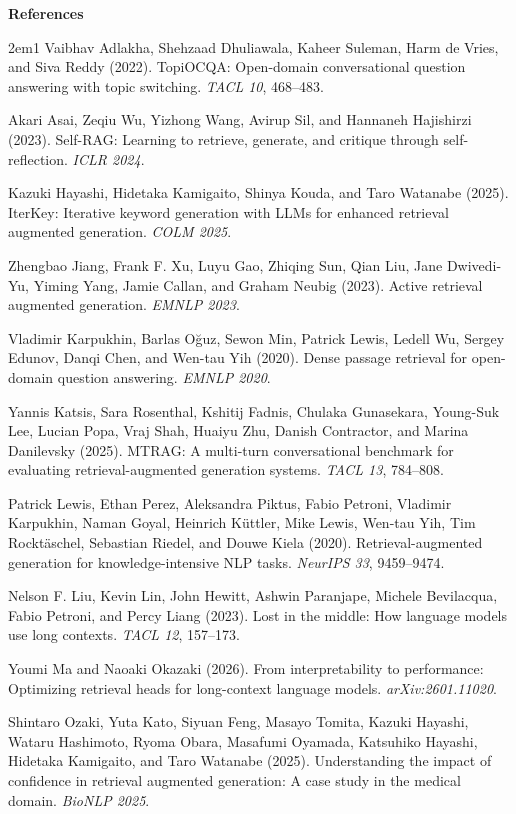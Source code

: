 \documentclass[11pt,a4paper]{article}
\begin{document}
\bigskip

\noindent\textbf{References}

\begin{hangparas}{2em}{1}
Vaibhav Adlakha, Shehzaad Dhuliawala, Kaheer Suleman, Harm de Vries, and Siva Reddy (2022). TopiOCQA:
    Open-domain conversational question answering with topic switching. \textit{TACL 10}, 468--483.

Akari Asai, Zeqiu Wu, Yizhong Wang, Avirup Sil, and Hannaneh Hajishirzi (2023). Self-RAG: Learning to retrieve, generate,
     and critique through self-reflection. \textit{ICLR 2024}.

Kazuki Hayashi, Hidetaka Kamigaito, Shinya Kouda, and Taro Watanabe (2025). IterKey: Iterative keyword generation with
    LLMs for enhanced retrieval augmented generation. \textit{COLM 2025}.

Zhengbao Jiang, Frank F. Xu, Luyu Gao, Zhiqing Sun, Qian Liu, Jane Dwivedi-Yu, Yiming Yang, Jamie Callan, and Graham
    Neubig (2023). Active retrieval augmented generation. \textit{EMNLP 2023}.

Vladimir Karpukhin, Barlas O\u{g}uz, Sewon Min, Patrick Lewis, Ledell Wu, Sergey Edunov, Danqi Chen, and Wen-tau Yih (2020).
    Dense passage retrieval for open-domain question answering. \textit{EMNLP 2020}.

Yannis Katsis, Sara Rosenthal, Kshitij Fadnis, Chulaka Gunasekara, Young-Suk Lee, Lucian Popa, Vraj Shah, Huaiyu Zhu,
    Danish Contractor, and Marina Danilevsky (2025). MTRAG: A multi-turn conversational benchmark for evaluating
    retrieval-augmented generation systems. \textit{TACL 13}, 784--808.

Patrick Lewis, Ethan Perez, Aleksandra Piktus, Fabio Petroni, Vladimir Karpukhin, Naman Goyal, Heinrich K\"uttler, Mike
    Lewis, Wen-tau Yih, Tim Rockt\"aschel, Sebastian Riedel, and Douwe Kiela (2020). Retrieval-augmented generation for
    knowledge-intensive NLP tasks. \textit{NeurIPS 33}, 9459--9474.

Nelson F. Liu, Kevin Lin, John Hewitt, Ashwin Paranjape, Michele Bevilacqua, Fabio Petroni, and Percy Liang (2023).
    Lost in the middle: How language models use long contexts. \textit{TACL 12}, 157--173.

Youmi Ma and Naoaki Okazaki (2026). From interpretability to performance: Optimizing retrieval heads for long-context
    language models. \textit{arXiv:2601.11020}.

Shintaro Ozaki, Yuta Kato, Siyuan Feng, Masayo Tomita, Kazuki Hayashi, Wataru Hashimoto, Ryoma Obara, Masafumi Oyamada,
    Katsuhiko Hayashi, Hidetaka Kamigaito, and Taro Watanabe (2025). Understanding the impact of confidence in
    retrieval augmented generation: A case study in the medical domain. \textit{BioNLP 2025}.


\end{hangparas}
\end{document}
